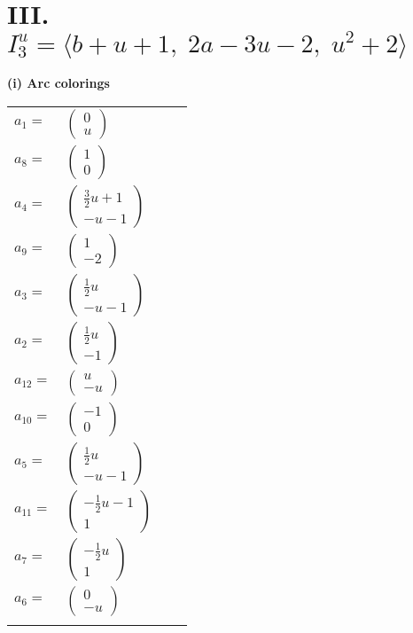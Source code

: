 \documentclass[1p]{elsarticle_modified}
\theoremstyle{definition}
\begin{document}
\centering \section*{III. $I^u_{3}= \langle b+u+1,\;2 a-3 u-2,\;u^2+2 \rangle$}
\flushleft \textbf{(i) Arc colorings}\\
\begin{tabular}{m{7pt} m{180pt} m{7pt} m{180pt} }
\flushright $a_{1}=$&$\begin{pmatrix}0\\u\end{pmatrix}$ \\
\flushright $a_{8}=$&$\begin{pmatrix}1\\0\end{pmatrix}$ \\
\flushright $a_{4}=$&$\begin{pmatrix}\frac{3}{2} u+1\\- u-1\end{pmatrix}$ \\
\flushright $a_{9}=$&$\begin{pmatrix}1\\-2\end{pmatrix}$ \\
\flushright $a_{3}=$&$\begin{pmatrix}\frac{1}{2} u\\- u-1\end{pmatrix}$ \\
\flushright $a_{2}=$&$\begin{pmatrix}\frac{1}{2} u\\-1\end{pmatrix}$ \\
\flushright $a_{12}=$&$\begin{pmatrix}u\\- u\end{pmatrix}$ \\
\flushright $a_{10}=$&$\begin{pmatrix}-1\\0\end{pmatrix}$ \\
\flushright $a_{5}=$&$\begin{pmatrix}\frac{1}{2} u\\- u-1\end{pmatrix}$ \\
\flushright $a_{11}=$&$\begin{pmatrix}-\frac{1}{2} u-1\\1\end{pmatrix}$ \\
\flushright $a_{7}=$&$\begin{pmatrix}-\frac{1}{2} u\\1\end{pmatrix}$ \\
\flushright $a_{6}=$&$\begin{pmatrix}0\\- u\end{pmatrix}$\\&\end{tabular}
\end{document}
